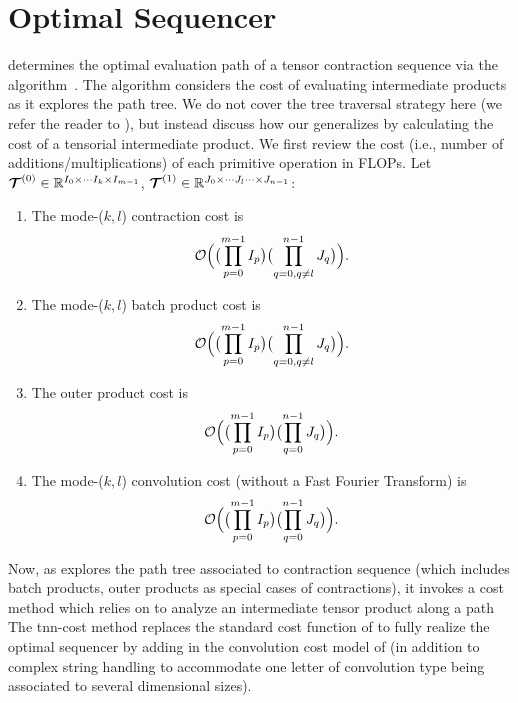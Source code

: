 \section{Optimal Sequencer}
\label{app:algorithms}

\opteinsum \citep{daniel2018opt} determines the optimal evaluation path of a tensor contraction sequence via the \netcon algorithm~\citep{pfeifer2014faster}. The algorithm considers the cost of evaluating intermediate products as it explores the path tree. We do not cover the tree traversal strategy here (we refer the reader to \citep{pfeifer2014faster}), but instead discuss how our \conveinsum generalizes \netcon by calculating the cost of a tensorial intermediate product. 
We first review the cost (i.e., number of additions/multiplications) of each primitive operation in FLOPs. Let $\bm{\mathcal{T}}^{(0)}\in\mathbb{R}^{I_0 \times \cdots I_k \times I_{m-1}}$, $\bm{\mathcal{T}}^{(1)}\in\mathbb{R}^{J_0 \times \cdots J_l  \cdots \times J_{n-1}}$:
\begin{enumerate}
    \item The mode-($k,l$) contraction cost is
    \begin{equation}
    \label{contraction-cost}
    \mathcal{O}\Bigl(\bigl(\prod_{p=0}^{m-1} I_p\bigr)\bigl(\prod_{q=0,q\neq l}^{n-1} J_q \bigr)\Bigr).
    \end{equation}
    \item The mode-($k,l$) batch product cost is 
    \begin{equation}
    \label{batch-cost}
    \mathcal{O}\Bigl(\bigl(\prod_{p=0}^{m-1} I_p\bigr)\bigl(\prod_{q=0, q\neq l}^{n-1} J_q \bigr)\Bigr).    
    \end{equation}
    \item The outer product cost is
    \begin{equation}
    \label{outer-prod-cost}
    \mathcal{O}\Bigl(\bigl(\prod_{p=0}^{m-1} I_p\bigr)\bigl(\prod_{q=0}^{n-1} J_q\bigr)\Bigr).
    \end{equation}
    \item The mode-($k,l$) convolution cost (without a Fast Fourier Transform) is
    \begin{equation}
    \label{convolution-cost}
    \mathcal{O}\Bigl(\bigl(\prod_{p=0}^{m-1} I_p\bigr)\bigl(\prod_{q=0}^{n-1} J_q\bigr)\Bigr).
    \end{equation}
\end{enumerate}
Now, as \netcon explores the path tree associated to contraction sequence (which includes batch products, outer products as special cases of contractions), it invokes a \textsf{cost} method which relies on  to analyze an intermediate tensor product along a path The \textsf{tnn-cost} method replaces the standard \textsf{cost} function of \netcon to fully realize the optimal sequencer by adding in the convolution cost model of  (in addition to complex string handling to accommodate one letter of convolution type being associated to several dimensional sizes). 

